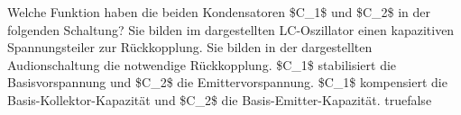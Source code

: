     {Welche Funktion haben die beiden Kondensatoren \$C\_1\$ und \$C\_2\$ in der folgenden Schaltung?}
    {Sie bilden im dargestellten LC-Oszillator einen kapazitiven Spannungsteiler zur Rückkopplung.}
    {Sie bilden in der dargestellten Audionschaltung die notwendige Rückkopplung.}
    {\$C\_1\$ stabilisiert die Basisvorspannung und \$C\_2\$ die Emittervorspannung.}
    {\$C\_1\$ kompensiert die Basis-Kollektor-Kapazität und \$C\_2\$ die Basis-Emitter-Kapazität.}
    {true}{false}